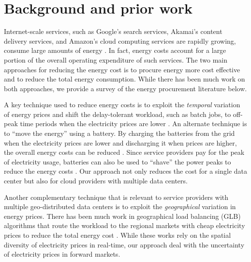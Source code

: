 \section{Background and prior work}
Internet-scale services, such as  Google's search services, Akamai's content delivery services, and Amazon's cloud computing services are rapidly growing, consume large amounts of energy \cite{koomey2011growth}. In fact, energy costs account for a large portion of the overall operating expenditure of such services.  The two main approaches for reducing the energy cost  is to procure energy more cost effective and to reduce the total energy consumption. While there has been much work on both approaches, we provide a survey of the energy procurement literature below.



A key technique used to reduce energy costs is to exploit the {\em temporal} variation of energy prices and  shift the delay-tolerant workload, such as batch jobs, to off-peak time periods when the electricity prices are lower \cite{gandhi2011minimizing, lin2013dynamic, meisner2011power, zhang2012dynamic}. An alternate technique is to ``move the energy'' using a battery. By charging the batteries from the grid when the electricity prices are lower and discharging it when prices are higher,  the overall energy costs can be reduced \cite{urgaonkar2011optimal, liu2013data}. Since service providers pay for the peak of electricity usage, batteries can also be used to ``shave'' the power peaks to reduce the energy costs \cite{palasamudram2012using}. Our approach not only reduces the cost for a single data center but also for cloud providers with multiple data centers.


Another complementary technique that is relevant to service providers with multiple geo-distributed data centers is to exploit the {\em geographical} variation in energy prices. There has been much work in geographical load balancing (GLB) algorithms that route the workload to the regional markets with cheap electricity prices to reduce the total energy cost \cite{qureshi2009cutting,liu2011greening}. While these works rely on the spatial diversity of electricity prices in real-time, our approach deal with the uncertainty of electricity prices in forward markets.

